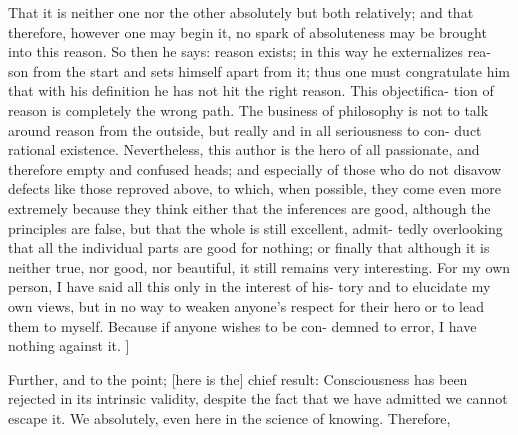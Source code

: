 That it is neither one nor the other absolutely but both relatively; and that
therefore, however one may begin it, no spark of absoluteness may be brought
into this reason.
So then he says: reason exists; in this way he externalizes rea-
son from the start and sets himself apart from it; thus one must congratulate
him that with his definition he has not hit the right reason.
This objectifica-
tion of reason is completely the wrong path.
The business of philosophy is not
to talk around reason from the outside, but really and in all seriousness to con-
duct rational existence.
Nevertheless, this author is the hero of all passionate,
and therefore empty and confused heads; and especially of those who do not
disavow defects like those reproved above, to which, when possible, they come
even more extremely because they think either that the inferences are good,
although the principles are false, but that the whole is still excellent, admit-
tedly overlooking that all the individual parts are good for nothing; or finally
that although it is neither true, nor good, nor beautiful, it still remains very
interesting.
For my own person, I have said all this only in the interest of his-
tory and to elucidate my own views, but in no way to weaken anyone’s respect
for their hero or to lead them to myself.
Because if anyone wishes to be con-
demned to error, I have nothing against it.
]

Further, and to the point;
[here is the] chief result:
Consciousness has been rejected in its intrinsic validity,
despite the fact that we have admitted we cannot escape it.
We absolutely, even here in the science of knowing.
Therefore,

